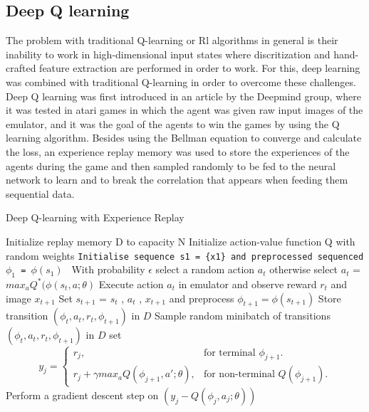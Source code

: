 \documentclass[12pt]{extarticle}
\begin{document}
\subsection{Deep Q learning}
The problem with traditional Q-learning or Rl algorithms in general is their inability to work in high-dimensional input states where discritization and hand-crafted feature extraction are performed in order to work. For this, deep learning was combined with traditional Q-learning in order to overcome these challenges. \cite{mnih2013playing}
Deep Q learning was first introduced in an article by the Deepmind group, where it was tested in atari games in which the agent was given raw input images of the emulator, and it was the goal of the agents to win the games by using the Q learning algorithm.
Besides using the Bellman equation to converge and calculate the loss, an experience replay memory was used to store the experiences of the agents during the game and then sampled randomly to be fed to the neural network to learn and to break the correlation that appears when feeding them sequential data. \cite{mnih2013playing}  

\begin{algorithm}
\caption{Deep Q-learning with Experience Replay}\label{alg:cap}
\begin{algorithmic}
\State Initialize replay memory D to capacity N
\State Initialize action-value function Q with random weights
        \State \texttt{Initialise sequence s1 = \{x1\} and preprocessed sequenced $\phi_{1}$ = $\phi(s_{1})$  }
         \State With probability $\epsilon$ select a random action $a_{t}$
         \State otherwise select  $a_{t}$ = $max_{a} Q^{*}(\phi(s_{t},a;\theta) $ 
         \State Execute action $a_{t}$ in emulator and observe reward ${r_{t}}$ and image $x_{t+1}$
        \State Set $s_{t+1}$ = $s_{t}$ , $a_{t}$ , $x_{t+1}$ and preprocess  
        $\phi_{t+1}=\phi(s_{t+1})$
        \State Store transition $(\phi_{t} , a_{t} , r_{t} , \phi_{t+1} )$ in $D$
        \State Sample random
minibatch of transitions $(\phi_{t} , a_{t} , r_{t} , \phi_{t+1} )$ in $D$
        \State set  \begin{equation}
  y_{j}=\begin{cases}
    r_{j}, & \text{for terminal $\phi_{j+1} $}.\\
    r_{j}+\gamma max_{a}Q(\phi_{j+1},a';\theta) , & \text{for non-terminal $Q(\phi_{j+1})$}.
  \end{cases}
\end{equation}
        \State Perform a gradient descent step on $(y_{j} - Q(\phi_{j} , a_{j} ; \theta))$ 
        \EndFor 
\EndFor 


\end{algorithmic}
\end{algorithm}
 
\end{document}
